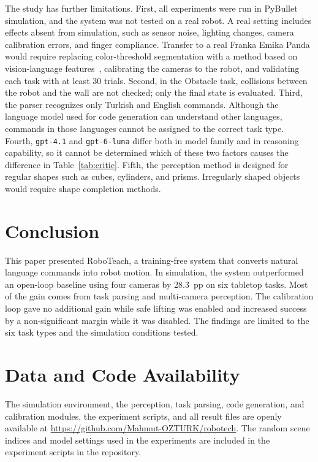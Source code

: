 \documentclass[preprint,12pt]{elsarticle}
\begin{document}
The study has further limitations. First, all experiments were run in PyBullet simulation, and the system was not tested on a real robot. A real setting includes effects absent from simulation, such as sensor noise, lighting changes, camera calibration errors, and finger compliance. Transfer to a real Franka Emika Panda would require replacing color-threshold segmentation with a method based on vision-language features~\cite{radford2021clip}, calibrating the cameras to the robot, and validating each task with at least 30 trials. Second, in the Obstacle task, collisions between the robot and the wall are not checked; only the final state is evaluated. Third, the parser recognizes only Turkish and English commands. Although the language model used for code generation can understand other languages, commands in those languages cannot be assigned to the correct task type. Fourth, \texttt{gpt-4.1} and \texttt{gpt-6-luna} differ both in model family and in reasoning capability, so it cannot be determined which of these two factors causes the difference in Table~\ref{tab:critic}. Fifth, the perception method is designed for regular shapes such as cubes, cylinders, and prisms. Irregularly shaped objects would require shape completion methods.

\section{Conclusion}

This paper presented RoboTeach, a training-free system that converts natural language commands into robot motion. In simulation, the system outperformed an open-loop baseline using four cameras by 28.3~pp on six tabletop tasks. Most of the gain comes from task parsing and multi-camera perception. The calibration loop gave no additional gain while safe lifting was enabled and increased success by a non-significant margin while it was disabled. The findings are limited to the six task types and the simulation conditions tested.

\section*{Data and Code Availability}

The simulation environment, the perception, task parsing, code generation, and calibration modules, the experiment scripts, and all result files are openly available at \url{https://github.com/Mahmut-OZTURK/robotech}. The random scene indices and model settings used in the experiments are included in the experiment scripts in the repository.
\end{document}
